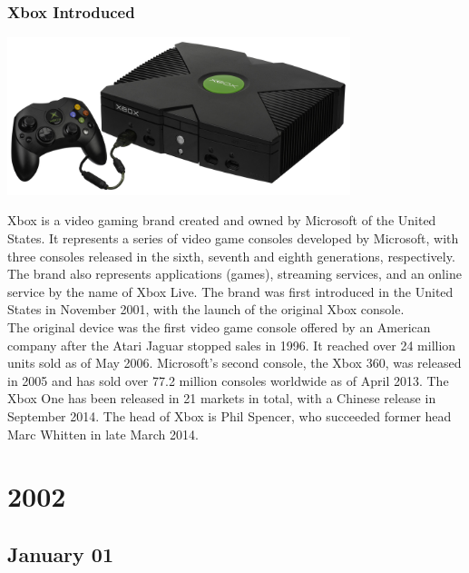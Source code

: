 \documentclass[11pt]{report}
\begin{document}
\subsection{Xbox Introduced}
\vspace{2mm}\begin{center}\includegraphics[width=10cm]{./img/xbox1.jpg}\end{center}
Xbox is a video gaming brand created and owned by Microsoft of the United States. It represents a series of video game consoles developed by Microsoft, with three consoles released in the sixth, seventh and eighth generations, respectively. The brand also represents applications (games), streaming services, and an online service by the name of Xbox Live. The brand was first introduced in the United States in November 2001, with the launch of the original Xbox console.\\
The original device was the first video game console offered by an American company after the Atari Jaguar stopped sales in 1996. It reached over 24 million units sold as of May 2006. Microsoft's second console, the Xbox 360, was released in 2005 and has sold over 77.2 million consoles worldwide as of April 2013. The Xbox One has been released in 21 markets in total, with a Chinese release in September 2014. The head of Xbox is Phil Spencer, who succeeded former head Marc Whitten in late March 2014.

\chapter{2002}
\section{January 01}
\end{document}
